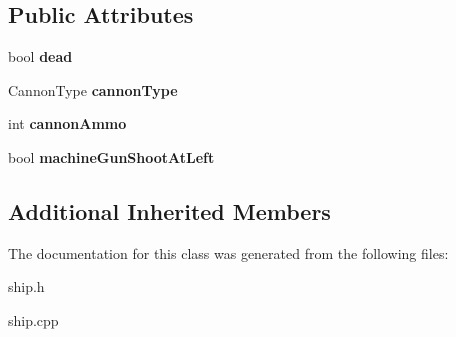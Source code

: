 \subsection*{Public Attributes}
\begin{DoxyCompactItemize}
\item 
\mbox{\label{classgame_1_1Ship_a43e9dadec1741f046cfac0522386da0d}} 
bool {\bfseries dead}
\item 
\mbox{\label{classgame_1_1Ship_a70b25ad47b9e9a65ab2f6c34c4ce3174}} 
Cannon\+Type {\bfseries cannon\+Type}
\item 
\mbox{\label{classgame_1_1Ship_a397681e2c3a543a411a8d5addc6bf2b1}} 
int {\bfseries cannon\+Ammo}
\item 
\mbox{\label{classgame_1_1Ship_aaad695df6b0fb0b9187df5da1d0475a6}} 
bool {\bfseries machine\+Gun\+Shoot\+At\+Left}
\end{DoxyCompactItemize}
\subsection*{Additional Inherited Members}


The documentation for this class was generated from the following files\+:\begin{DoxyCompactItemize}
\item 
ship.\+h\item 
ship.\+cpp\end{DoxyCompactItemize}
